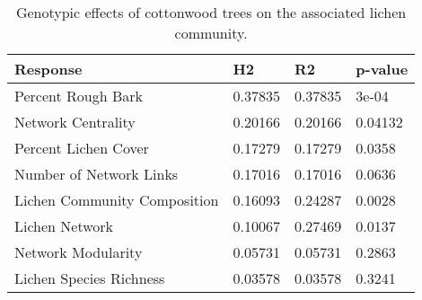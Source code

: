 \begin{table}[ht]
\centering
\begin{tabular}{llll}
  \hline
Response & H2 & R2 & p-value \\ 
  \hline
Percent Rough Bark & 0.37835 & 0.37835 & 3e-04 \\ 
  Network Centrality & 0.20166 & 0.20166 & 0.04132 \\ 
  Percent Lichen Cover & 0.17279 & 0.17279 & 0.0358 \\ 
  Number of Network Links & 0.17016 & 0.17016 & 0.0636 \\ 
  Lichen Community Composition & 0.16093 & 0.24287 & 0.0028 \\ 
  Lichen Network & 0.10067 & 0.27469 & 0.0137 \\ 
  Network Modularity & 0.05731 & 0.05731 & 0.2863 \\ 
  Lichen Species Richness & 0.03578 & 0.03578 & 0.3241 \\ 
   \hline
\end{tabular}
\caption{Genotypic effects of cottonwood trees on the associated lichen community.} 
\label{tab:h2_table}
\end{table}

